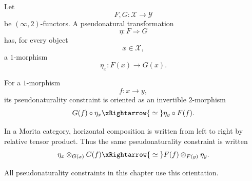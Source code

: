 \begin{convention}
\label{conv:morita-pseudonaturality-orientation}
Let
\[
    F,G
    \colon
    \mathcal X
    \longrightarrow
    \mathcal Y
\]
be $(\infty,2)$-functors. A pseudonatural transformation
\[
    \eta
    \colon
    F
    \Longrightarrow
    G
\]
has, for every object
\[
    x\in\mathcal X,
\]
a $1$-morphism
\[
    \eta_x
    \colon
    F(x)
    \longrightarrow
    G(x).
\]

For a $1$-morphism
\[
    f
    \colon
    x
    \longrightarrow
    y,
\]
its pseudonaturality constraint is oriented as an invertible
$2$-morphism
\[
    G(f)\circ\eta_x
    \xRightarrow{\;\simeq\;}
    \eta_y\circ F(f).
\]

In a Morita category, horizontal composition is written from left to
right by relative tensor product. Thus the same pseudonaturality
constraint is written
\[
    \eta_x
    \otimes_{G(x)}
    G(f)
    \xRightarrow{\;\simeq\;}
    F(f)
    \otimes_{F(y)}
    \eta_y.
\]

All pseudonaturality constraints in this chapter use this orientation.
\end{convention}


